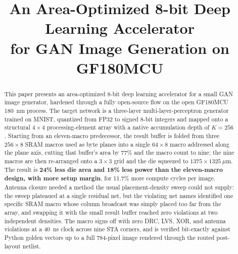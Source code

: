 \documentclass[conference,a4paper]{APSIPA2026}
\begin{document}
\title{An Area-Optimized 8-bit Deep Learning Accelerator\\for GAN Image Generation on GF180MCU}

\author{
}

\maketitle
\thispagestyle{firststyle}
\pagestyle{empty}

\begin{abstract}
This paper presents an area-optimized 8-bit deep learning accelerator for a small GAN image generator, hardened through a fully open-source flow on the open GF180MCU 180~nm process. The target network is a three-layer multi-layer-perceptron generator trained on MNIST, quantized from FP32 to signed 8-bit integers and mapped onto a structural $4\times4$ processing-element array with a native accumulation depth of $K=256$. Starting from an eleven-macro predecessor, the result buffer is folded from three $256\times8$ SRAM macros used as byte planes into a single $64\times8$ macro addressed along the plane axis, cutting that buffer's area by 77\% and the macro count to nine; the nine macros are then re-arranged onto a $3\times3$ grid and the die squeezed to $1375\times1325~\mu$m. The result is \textbf{24\% less die area and 18\% less power than the eleven-macro design, with more setup margin}, for 11.7\% more compute cycles per image. Antenna closure needed a method the usual placement-density sweep could not supply: the sweep plateaued at a single residual net, but the violating net names identified one specific SRAM macro whose column broadcast was simply placed too far from the array, and swapping it with the small result buffer reached zero violations at two independent densities. The macro signs off with zero DRC, LVS, XOR, and antenna violations at a 40~ns clock across nine STA corners, and is verified bit-exactly against Python golden vectors up to a full 784-pixel image rendered through the routed post-layout netlist.
\end{abstract}
\end{document}
